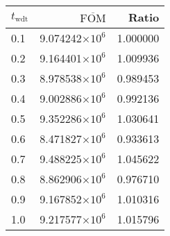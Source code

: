 \begin{tabular}{lrr}
\toprule
$t_{\mathrm{wdt}}$ & $\overline{\mathrm{FOM}}$ &    Ratio \\
\midrule
               0.1 &   9.074242$\times 10^{6}$ & 1.000000 \\
               0.2 &   9.164401$\times 10^{6}$ & 1.009936 \\
               0.3 &   8.978538$\times 10^{6}$ & 0.989453 \\
               0.4 &   9.002886$\times 10^{6}$ & 0.992136 \\
               0.5 &   9.352286$\times 10^{6}$ & 1.030641 \\
               0.6 &   8.471827$\times 10^{6}$ & 0.933613 \\
               0.7 &   9.488225$\times 10^{6}$ & 1.045622 \\
               0.8 &   8.862906$\times 10^{6}$ & 0.976710 \\
               0.9 &   9.167852$\times 10^{6}$ & 1.010316 \\
               1.0 &   9.217577$\times 10^{6}$ & 1.015796 \\
\bottomrule
\end{tabular}
